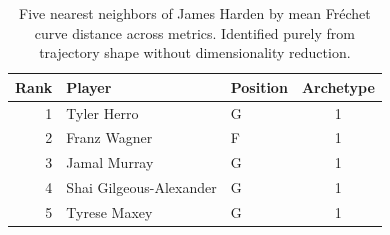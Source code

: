 \begin{table}[htbp]
  \centering\small
  \begin{tabular}{rllc}
    \toprule
    Rank & Player & Position & Archetype \\
    \midrule
    1 & Tyler Herro & G & 1 \\
    2 & Franz Wagner & F & 1 \\
    3 & Jamal Murray & G & 1 \\
    4 & Shai Gilgeous-Alexander & G & 1 \\
    5 & Tyrese Maxey & G & 1 \\
    \bottomrule
  \end{tabular}
  \caption{Five nearest neighbors of James Harden by mean Fr\'{e}chet curve distance across metrics. Identified purely from trajectory shape without dimensionality reduction.}
  \label{tab:James_Harden_frechet_curve_neighbors}
\end{table}


